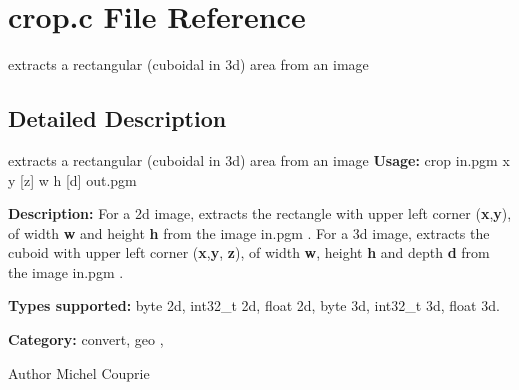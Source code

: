 \section{crop.c File Reference}
\label{crop_8c}


extracts a rectangular (cuboidal in 3d) area from an image  




\subsection{Detailed Description}
extracts a rectangular (cuboidal in 3d) area from an image {\bfseries Usage:} crop in.pgm x y [z] w h [d] out.pgm

{\bfseries Description:} For a 2d image, extracts the rectangle with upper left corner ({\bfseries x},{\bfseries y}), of width {\bfseries w} and height {\bfseries h} from the image in.pgm . For a 3d image, extracts the cuboid with upper left corner ({\bfseries x},{\bfseries y}, {\bfseries z}), of width {\bfseries w}, height {\bfseries h} and depth {\bfseries d} from the image in.pgm .

{\bfseries Types supported:} byte 2d, int32\_\-t 2d, float 2d, byte 3d, int32\_\-t 3d, float 3d.

{\bfseries Category:} convert, geo ,

\begin{DoxyAuthor}{Author}
Michel Couprie 
\end{DoxyAuthor}
